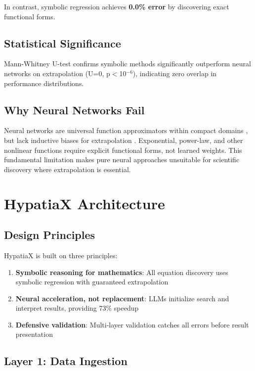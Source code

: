 \documentclass[twoside,11pt]{article}
\begin{document}
In contrast, symbolic regression achieves \textbf{0.0\% error} by discovering exact functional forms.

\subsection{Statistical Significance}

Mann-Whitney U-test confirms symbolic methods significantly outperform neural networks on extrapolation (U=0, p$<$10$^{-6}$), indicating zero overlap in performance distributions.

\subsection{Why Neural Networks Fail}

Neural networks are universal function approximators within compact domains \citep{cybenko1989approximation}, but lack inductive biases for extrapolation \citep{xu2020neural}. Exponential, power-law, and other nonlinear functions require explicit functional forms, not learned weights. This fundamental limitation makes pure neural approaches unsuitable for scientific discovery where extrapolation is essential.

\section{HypatiaX Architecture}
\label{sec:architecture}

\subsection{Design Principles}

HypatiaX is built on three principles:

\begin{enumerate}
\item \textbf{Symbolic reasoning for mathematics}: All equation discovery uses symbolic regression with guaranteed extrapolation
\item \textbf{Neural acceleration, not replacement}: LLMs initialize search and interpret results, providing 73\% speedup
\item \textbf{Defensive validation}: Multi-layer validation catches all errors before result presentation
\end{enumerate}

\subsection{Layer 1: Data Ingestion}
\end{document}
